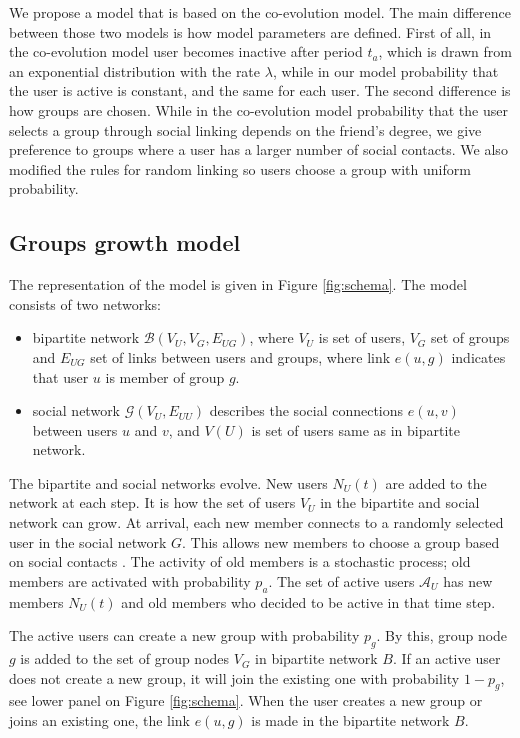 We propose a model that is based on the co-evolution model. The main difference between those two models is how model parameters are defined. First of all, in the co-evolution model user becomes inactive after period $t_a$, which is drawn from an exponential distribution with the rate $\lambda$, while in our model probability that the user is active is constant, and the same for each user. The second difference is how groups are chosen. While in the co-evolution model probability that the user selects a group through social linking depends on the friend's degree, we give preference to groups where a user has a larger number of social contacts. We also modified the rules for random linking so users choose a group with uniform probability.

\subsection{Groups growth model}

The representation of the model is given in Figure \ref{fig:schema}. The model consists of two networks:
\begin{itemize}
	\item bipartite network $\mathcal{B}(V_{U}, V_{G}, E_{UG})$, where $V_U$ is set of users, $V_G$ set of groups and $E_{UG}$ set of links between users and groups, where link $e(u,g)$ indicates that user $u$ is member of group $g$.
	\item social network $\mathcal{G}(V_{U},E_{UU})$ describes the social connections $e(u, v)$ between users $u$ and $v$, and  $V(U)$ is set of users same as in bipartite network. 
\end{itemize}

The bipartite and social networks evolve. New users $N_U(t)$ are added to the network at each step. It is how the set of users $V_U$ in the bipartite and social network can grow. At arrival, each new member connects to a randomly selected user in the social network $G$. This allows new members to choose a group based on social contacts \cite{kairam2012life}. The activity of old members is a stochastic process; old members are activated with probability $p_a$. The set of active users $\mathcal{A}_{U}$ has new members $N_U(t)$ and old members who decided to be active in that time step.

The active users can create a new group with probability $p_g$. By this, group node $g$ is added to the set of group nodes $V_G$ in bipartite network $B$. If an active user does not create a new group, it will join the existing one with probability $1-p_g$, see lower panel on Figure \ref{fig:schema}. When the user creates a new group or joins an existing one, the link $e(u,g)$ is made in the bipartite network $B$.

